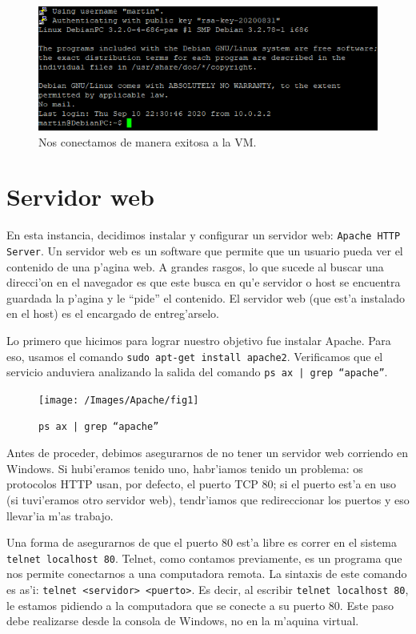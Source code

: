 \documentclass[11pt]{article}
\begin{document}
		\begin{figure}[H]
    			\centering
    			\includegraphics[scale=0.75]{Images/Connection/final_connection.PNG}
    			\caption{Nos conectamos de manera exitosa a la VM.}
    			\label{fig:final_connection}
		\end{figure}
		
		
	\section{Servidor web}

		En esta instancia, decidimos instalar y configurar un servidor web: \texttt{Apache HTTP Server}. Un servidor web es un software que permite que un usuario pueda ver el contenido de una p'agina web. A grandes rasgos, lo que sucede al buscar una direcci'on en el navegador es que este busca en qu'e servidor o host se encuentra guardada la p'agina y le ``pide'' el contenido. El servidor web (que est'a instalado en el host) es el encargado de entreg'arselo.

		Lo primero que hicimos para lograr nuestro objetivo fue instalar Apache. Para eso, usamos el comando \texttt{sudo apt-get install apache2}. Verificamos que el servicio anduviera analizando la salida del comando \texttt{ps ax | grep ``apache''}.


		\begin{figure}[H]
    			\centering
   			\texttt{[image: /Images/Apache/fig1]}
   			\caption{\texttt{ps ax | grep ``apache''}}
    			\label{fig:1}
		\end{figure}

		Antes de proceder, debimos asegurarnos de no tener un servidor web corriendo en Windows. Si hubi'eramos tenido uno, habr'iamos tenido un problema: os protocolos HTTP usan, por defecto, el puerto TCP 80; si el puerto est'a en uso (si tuvi'eramos otro servidor web), tendr'iamos que redireccionar los puertos y eso llevar'ia m'as trabajo.

		Una forma de asegurarnos de que el puerto 80 est'a libre es correr en el sistema \texttt{telnet localhost 80}. Telnet, como contamos previamente, es un programa que nos permite conectarnos a una computadora remota. La sintaxis de este comando es as'i: \texttt{telnet <servidor>{} <puerto>}. Es decir, al escribir \texttt{telnet localhost 80}, le estamos pidiendo a la computadora que se conecte a su puerto 80. Este paso debe realizarse desde la consola de Windows, no en la m'aquina virtual.
\end{document}
